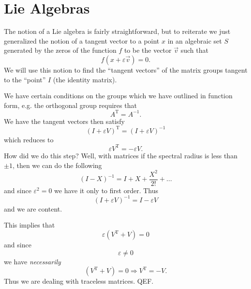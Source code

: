 \section{Lie Algebras}

The notion of a Lie algebra is fairly straightforward, but to reiterate we just
generalized the notion of a tangent vector to a point $x$ in an algebraic set
$S$ generated by the zeros of the function $f$ to be the vector $\vec{v}$ such
that
\begin{equation}
f(x + \varepsilon\vec{v}) = 0.
\end{equation}
We will use this notion to find the ``tangent vectors'' of the matrix groups
tangent to the ``point'' $I$ (the identity matrix).

\begin{ex}
We have certain conditions on the groups which we have outlined in function form, 
e.g. the orthogonal group requires that
\begin{equation}
A^\textrm{T} = A^{-1}.
\end{equation}
We have the tangent vectors then satisfy
\begin{equation}
(I + \varepsilon V)^\textrm{T} = (I + \varepsilon V)^{-1}
\end{equation}
which reduces to
\begin{equation}
\varepsilon V^\textrm{T} = -\varepsilon V.
\end{equation}
How did we do this step? Well, with matrices if the spectral radius is less than
$\pm1$, then we can do the following
\begin{equation}
(I - X)^{-1} = I + X + \frac{X^2}{2!} + \ldots
\end{equation}
and since $\varepsilon^2 = 0$ we have it only to first order. Thus
\begin{equation}
(I + \varepsilon V)^{-1} = I - \varepsilon V
\end{equation}
and we are content.

This implies that
\begin{equation}
\varepsilon(V^\textrm{T} + V) = 0
\end{equation}
and since 
\begin{equation}
\varepsilon\neq 0
\end{equation}
we have \emph{necessarily}
\begin{equation}\label{orthogonalLieAlgebra}
(V^\textrm{T} + V) = 0\Rightarrow V^\textrm{T}=-V.
\end{equation}
Thus we are dealing with traceless matrices. QEF.
\end{ex}

